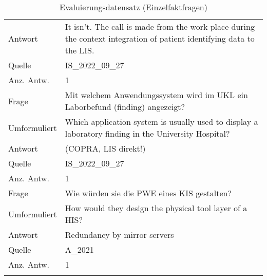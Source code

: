 \begin{landscape}
\begin{longtable}{p{3cm}p{}}
    Antwort & It isn't. The call is made from the work place during the context integration of patient identifying data to the LIS.\\
    Quelle & IS\_2022\_09\_27 \\
    Anz. Antw.& 1 \\
    \midrule
    Frage & Mit welchem Anwendungssystem wird im UKL ein Laborbefund (finding) angezeigt? \\
    Umformuliert & Which application system is usually used to display a laboratory finding in the University Hospital? \\
    Antwort & (COPRA, LIS direkt!) \\
    Quelle & IS\_2022\_09\_27 \\
    Anz. Antw.& 1 \\
    \midrule
    Frage & Wie würden sie die PWE eines KIS gestalten? \\
    Umformuliert & How would they design the physical tool layer of a HIS? \\
    Antwort & Redundancy by mirror servers \\
    Quelle & A\_2021 \\
    Anz. Antw.& 1\\
\bottomrule
\caption*{Evaluierungsdatensatz (Einzelfaktfragen)}\label{tab:evaldata-single}
\end{longtable}
\end{landscape}

